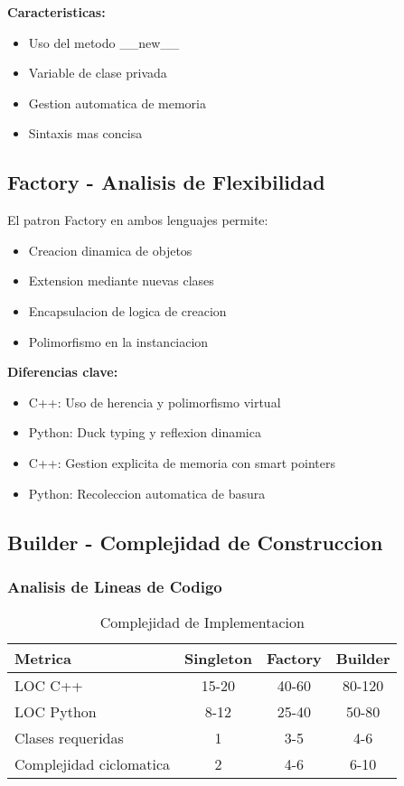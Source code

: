 \documentclass[11pt,a4paper]{article}
\begin{document}
\textbf{Caracteristicas:}
\begin{itemize}
    \item Uso del metodo \_\_new\_\_
    \item Variable de clase privada
    \item Gestion automatica de memoria
    \item Sintaxis mas concisa
\end{itemize}

\subsection{Factory - Analisis de Flexibilidad}

El patron Factory en ambos lenguajes permite:

\begin{itemize}
    \item Creacion dinamica de objetos
    \item Extension mediante nuevas clases
    \item Encapsulacion de logica de creacion
    \item Polimorfismo en la instanciacion
\end{itemize}

\textbf{Diferencias clave:}
\begin{itemize}
    \item C++: Uso de herencia y polimorfismo virtual
    \item Python: Duck typing y reflexion dinamica
    \item C++: Gestion explicita de memoria con smart pointers
    \item Python: Recoleccion automatica de basura
\end{itemize}

\subsection{Builder - Complejidad de Construccion}

\subsubsection{Analisis de Lineas de Codigo}

\begin{table}[H]
\centering
\caption{Complejidad de Implementacion}
\begin{tabular}{|l|c|c|c|}
\hline
\textbf{Metrica} & \textbf{Singleton} & \textbf{Factory} & \textbf{Builder} \\
\hline
LOC C++ & 15-20 & 40-60 & 80-120 \\
LOC Python & 8-12 & 25-40 & 50-80 \\
Clases requeridas & 1 & 3-5 & 4-6 \\
Complejidad ciclomatica & 2 & 4-6 & 6-10 \\
\hline
\end{tabular}
\end{table}
\end{document}
